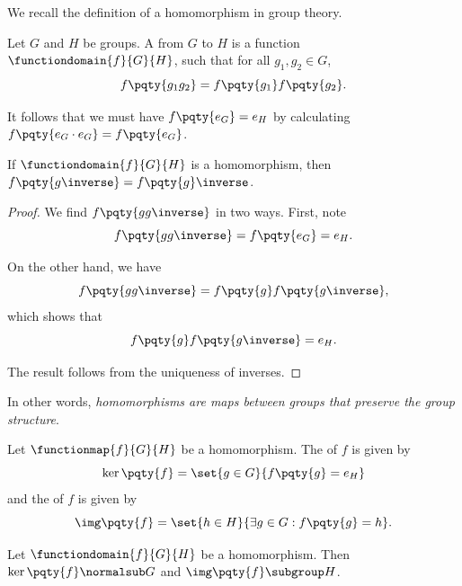 We recall the definition of a homomorphism in group theory.

\begin{definition}
    \label{def:group-homomorphism}%
    Let \(G\) and \(H\) be groups. A  from \(G\) to \(H\) is a function \(\functiondomain{f}{G}{H}\), such that for all \(g_1, g_2 \in G\),
    \[
        f\pqty{g_1 g_2} = f\pqty{g_1} f\pqty{g_2}.
    \]
\end{definition}

It follows that we must have \(f\pqty{e_G} = e_H\) by calculating \(f\pqty{e_G \cdot e_G} = f\pqty{e_G}\).

\begin{lemma}
    \label{lem:group-homomorphisms-inverses}%
    If \(\functiondomain{f}{G}{H}\) is a homomorphism, then \(f\pqty{g\inverse} = f\pqty{g}\inverse\).
\end{lemma}

\begin{proof}
    We find \(f\pqty{g g\inverse}\) in two ways. First, note
    \[
        f\pqty{g g\inverse} = f\pqty{e_G} = e_H.
    \]

    On the other hand, we have
    \[
        f\pqty{g g\inverse} = f\pqty{g} f\pqty{g \inverse},
    \]
    which shows that
    \[
        f \pqty{g} f\pqty{g \inverse} = e_H.
    \]

    The result follows from the uniqueness of inverses.
\end{proof}

In other words, \emph{homomorphisms are maps between groups that preserve the group structure}.

\begin{definition}
    \label{def:group-homomorphism-kernel-image}%
    Let \(\functionmap{f}{G}{H}\) be a homomorphism. The  of \(f\) is given by
    \[
        \ker \pqty{f} = \set{g \in G}{f\pqty{g} = e_H}
    \]
    and the  of \(f\) is given by
    \[
        \img \pqty{f} = \set{h \in H}{\exists g \in G: f\pqty{g} = h}.
    \]
\end{definition}

\begin{proposition}
    \label{prop:kernel-normal-subgroup-image-subgroup}%
    Let \(\functiondomain{f}{G}{H}\) be a homomorphism. Then \(\ker\pqty{f} \normalsub G\) and \(\img\pqty{f} \subgroup H\).
\end{proposition}

